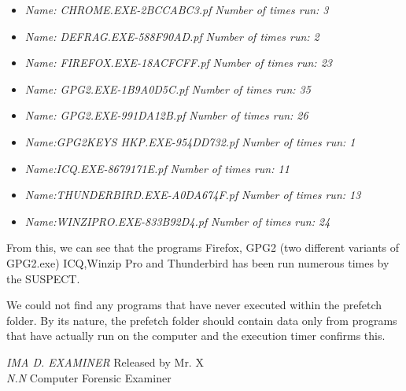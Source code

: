 \begin{enumerate}
\begin{itemize}
		\begin{itemize}
			\item \textit{Name: CHROME.EXE-2BCCABC3.pf}   \textit{Number of times run: 3}		
			\item \textit{Name: DEFRAG.EXE-588F90AD.pf}   \textit{Number of times run: 2}
			\item \textit{Name: FIREFOX.EXE-18ACFCFF.pf}   \textit{Number of times run: 23}
			\item \textit{Name: GPG2.EXE-1B9A0D5C.pf}   \textit{Number of times run: 35}
			\item \textit{Name: GPG2.EXE-991DA12B.pf}  	\textit{Number of times run: 26}
			\item \textit{Name:GPG2KEYS \textunderscore HKP.EXE-954DD732.pf}   \textit{Number of times run: 1}
			\item \textit{Name:ICQ.EXE-8679171E.pf}   	\textit{Number of times run: 11}
			\item \textit{Name:THUNDERBIRD.EXE-A0DA674F.pf}   \textit{Number of times run: 13}
			\item \textit{Name:WINZIPRO.EXE-833B92D4.pf}  	\textit{Number of times run: 24}
			
		\end{itemize}
	
	From this, we can see that the programs Firefox, GPG2 (two different variants of GPG2.exe) ICQ,Winzip Pro and Thunderbird has been run numerous times by the SUSPECT.
	
	We could not find any programs that have never executed within the prefetch folder. By its nature, the prefetch folder should contain data only from programs that have actually run on the computer and the execution timer confirms this.
	
\end{itemize}

\end{enumerate}

\noindent \textit{IMA D. EXAMINER}	\hfill Released by {\wesa Mr. X}\\
\textit{N.N} Computer Forensic Examiner
\clearpage

